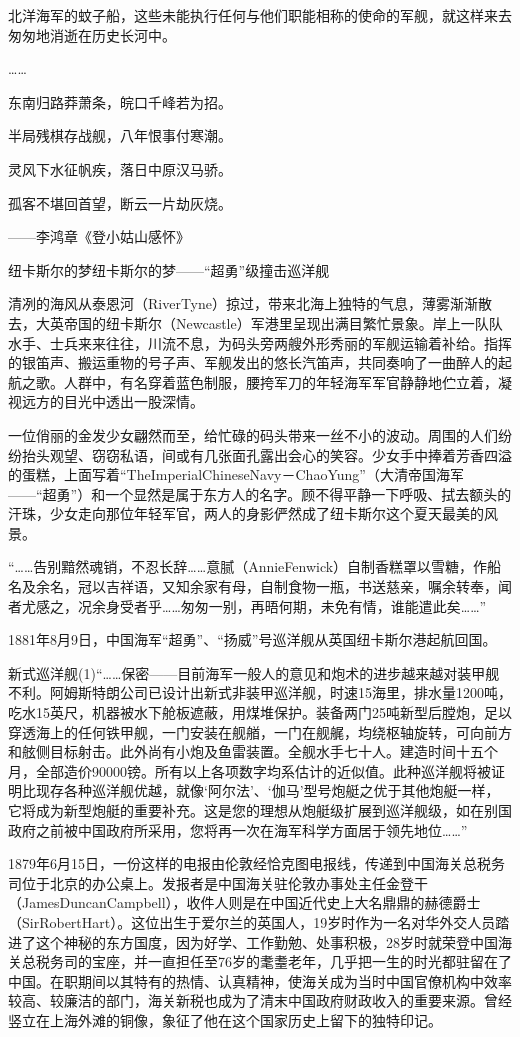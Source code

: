 \documentclass[12pt,UTF8]{ctexbook}
\begin{document}
北洋海军的蚊子船，这些未能执行任何与他们职能相称的使命的军舰，就这样来去匆匆地消逝在历史长河中。

……

东南归路莽萧条，皖口千峰若为招。

半局残棋存战舰，八年恨事付寒潮。

灵风下水征帆疾，落日中原汉马骄。

孤客不堪回首望，断云一片劫灰烧。

——李鸿章《登小姑山感怀》

纽卡斯尔的梦纽卡斯尔的梦——“超勇”级撞击巡洋舰

清冽的海风从泰恩河（RiverTyne）掠过，带来北海上独特的气息，薄雾渐渐散去，大英帝国的纽卡斯尔（Newcastle）军港里呈现出满目繁忙景象。岸上一队队水手、士兵来来往往，川流不息，为码头旁两艘外形秀丽的军舰运输着补给。指挥的银笛声、搬运重物的号子声、军舰发出的悠长汽笛声，共同奏响了一曲醉人的起航之歌。人群中，有名穿着蓝色制服，腰挎军刀的年轻海军军官静静地伫立着，凝视远方的目光中透出一股深情。

一位俏丽的金发少女翩然而至，给忙碌的码头带来一丝不小的波动。周围的人们纷纷抬头观望、窃窃私语，间或有几张面孔露出会心的笑容。少女手中捧着芳香四溢的蛋糕，上面写着“TheImperialChineseNavy－ChaoYung”（大清帝国海军——“超勇”）和一个显然是属于东方人的名字。顾不得平静一下呼吸、拭去额头的汗珠，少女走向那位年轻军官，两人的身影俨然成了纽卡斯尔这个夏天最美的风景。

“……告别黯然魂销，不忍长辞……意腻（AnnieFenwick）自制香糕罩以雪糖，作船名及余名，冠以吉祥语，又知余家有母，自制食物一瓶，书送慈亲，嘱余转奉，闻者尤感之，况余身受者乎……匆匆一别，再晤何期，未免有情，谁能遣此矣……”

1881年8月9日，中国海军“超勇”、“扬威”号巡洋舰从英国纽卡斯尔港起航回国。

新式巡洋舰(1)“……保密——目前海军一般人的意见和炮术的进步越来越对装甲舰不利。阿姆斯特朗公司已设计出新式非装甲巡洋舰，时速15海里，排水量1200吨，吃水15英尺，机器被水下舱板遮蔽，用煤堆保护。装备两门25吨新型后膛炮，足以穿透海上的任何铁甲舰，一门安装在舰艏，一门在舰艉，均绕枢轴旋转，可向前方和舷侧目标射击。此外尚有小炮及鱼雷装置。全舰水手七十人。建造时间十五个月，全部造价90000镑。所有以上各项数字均系估计的近似值。此种巡洋舰将被证明比现存各种巡洋舰优越，就像‘阿尔法’、‘伽马’型号炮艇之优于其他炮艇一样，它将成为新型炮艇的重要补充。这是您的理想从炮艇级扩展到巡洋舰级，如在别国政府之前被中国政府所采用，您将再一次在海军科学方面居于领先地位……”

1879年6月15日，一份这样的电报由伦敦经恰克图电报线，传递到中国海关总税务司位于北京的办公桌上。发报者是中国海关驻伦敦办事处主任金登干（JamesDuncanCampbell），收件人则是在中国近代史上大名鼎鼎的赫德爵士（SirRobertHart）。这位出生于爱尔兰的英国人，19岁时作为一名对华外交人员踏进了这个神秘的东方国度，因为好学、工作勤勉、处事积极，28岁时就荣登中国海关总税务司的宝座，并一直担任至76岁的耄耋老年，几乎把一生的时光都驻留在了中国。在职期间以其特有的热情、认真精神，使海关成为当时中国官僚机构中效率较高、较廉洁的部门，海关新税也成为了清末中国政府财政收入的重要来源。曾经竖立在上海外滩的铜像，象征了他在这个国家历史上留下的独特印记。
\end{document}
